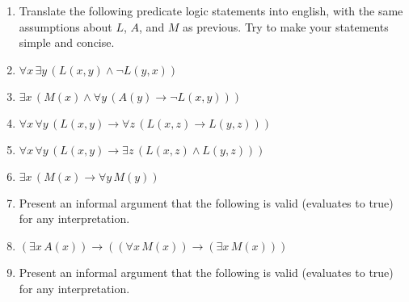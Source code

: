 \documentclass{cs81-homework}
\begin{document}
\begin{enumerate}
\item[] Translate the following predicate logic statements into english, with
  the same assumptions about \(L\), \(A\), and \(M\) as previous. Try to make
  your statements simple and concise.
  
\item {} \(\forall x \, \exists y \, (L(x, y) \land \lnot L(y, x))\)

  \begin{solution}
  \end{solution}

\item {}
  \(\exists x \, (M(x) \land \forall y \, (A(y) \to \lnot L(x, y)))\)

  \begin{solution}
  \end{solution}

\item {}
  \(\forall x \, \forall y \, (L(x, y) \to \forall z \, (L(x, z) \to L(y, z)))\)

  \begin{solution}
  \end{solution}

\item {}
  \(\forall x \, \forall y \, (L(x, y) \to \exists z \, (L(x, z) \land L (y,
  z)))\)

  \begin{solution}
  \end{solution}

\item {} \(\exists x \, (M(x) \to \forall y \, M(y))\)

  \begin{solution}
  \end{solution}

\item[] Present an informal argument that the following is valid (evaluates to
  true) for any interpretation.
  
\item {}
  \((\exists x \, A(x)) \to ((\forall x \, M(x)) \to (\exists x \, M(x)))\)

  \begin{solution}
  \end{solution}

\item[] Present an informal argument that the following is valid (evaluates to
  true) for any interpretation.


\end{enumerate}
\end{document}
